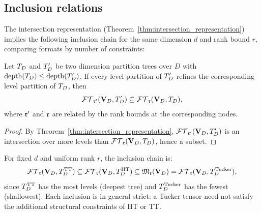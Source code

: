 \subsection*{Inclusion relations}

The intersection representation (Theorem~\ref{thm:intersection_representation})
implies the following inclusion chain for the same dimension $d$ and
rank bound $r$, comparing formats by number of constraints:

\begin{proposition}
\label{prop:inclusion_formats}
Let $T_D$ and $T_D'$ be two dimension partition trees over $D$ with
$\mathrm{depth}(T_D) \leq \mathrm{depth}(T_D')$. If every level partition of $T_D'$
refines the corresponding level partition of $T_D$, then
\begin{equation*}
    \mathcal{FT}_{\mathfrak{r}'}(\mathbf{V}_D,T_D') \subseteq \mathcal{FT}_{\mathfrak{r}}(\mathbf{V}_D,T_D),
\end{equation*}
where $\mathfrak{r}'$ and $\mathfrak{r}$ are related by the rank bounds at the
corresponding nodes.
\end{proposition}

\begin{proof}
By Theorem~\ref{thm:intersection_representation}, $\mathcal{FT}_{\mathfrak{r}'}(\mathbf{V}_D,T_D')$
is an intersection over more levels than $\mathcal{FT}_{\mathfrak{r}}(\mathbf{V}_D,T_D)$, hence
a subset.
\end{proof}

For fixed $d$ and uniform rank $r$, the inclusion chain is:
\begin{equation}
\label{eq:inclusion_chain}
    \mathcal{FT}_{\mathfrak{r}}(\mathbf{V}_D,T_D^{\mathrm{TT}}) \subseteq \mathcal{FT}_{\mathfrak{r}}(\mathbf{V}_D,T_D^{\mathrm{HT}})
    \subseteq \mathfrak{M}_{\mathfrak{r}}(\mathbf{V}_D) = \mathcal{FT}_{\mathfrak{r}}(\mathbf{V}_D,T_D^{\mathrm{Tucker}}),
\end{equation}
since $T_D^{\mathrm{TT}}$ has the most levels (deepest tree) and $T_D^{\mathrm{Tucker}}$ has
the fewest (shallowest). Each inclusion is in general strict: a Tucker
tensor need not satisfy the additional structural constraints of HT or TT.

